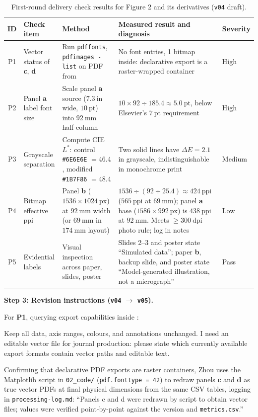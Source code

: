 \begin{table}[htbp]\centering\footnotesize
\setlength{\tabcolsep}{3pt}
\renewcommand{\arraystretch}{1.18}
\caption{First-round delivery check results for Figure 2 and its derivatives (\texttt{v04} draft).}\label{tab:ch13-case-round1}
\begin{tabularx}{\linewidth}{@{}c>{\raggedright\arraybackslash}p{22mm}>{\raggedright\arraybackslash}p{26mm}Y>{\raggedright\arraybackslash}p{16mm}@{}}
\toprule
\textbf{ID} & \textbf{Check item} & \textbf{Method} & \textbf{Measured result and diagnosis} & \textbf{Severity} \\
\midrule
P1 & Vector status of \textbf{c}, \textbf{d} & Run \texttt{pdffonts}, \texttt{pdfimages -list} on PDF from  & No font entries, 1 bitmap inside: declarative export is a raster-wrapped container & High \\
P2 & Panel \textbf{a} label font size & Scale panel \textbf{a} source ($7.3\ \text{in}$ wide, $10\ \text{pt}$) into $92\ \text{mm}$ half-column & $10 \times 92 \div 185.4 \approx 5.0\ \text{pt}$, below Elsevier's $7\ \text{pt}$ requirement & High \\
P3 & Grayscale separation & Compute CIE $L^*$: control \texttt{\#6E6E6E} $= 46.4$, modified \texttt{\#1B7F86} $= 48.4$ & Two solid lines have $\Delta E = 2.1$ in grayscale, indistinguishable in monochrome print & Medium \\
P4 & Bitmap effective ppi & Panel \textbf{b} ($1536 \times 1024\ \text{px}$) at $92\ \text{mm}$ width (or $69\ \text{mm}$ in $174\ \text{mm}$ layout) & $1536 \div (92 \div 25.4) \approx 424\ \text{ppi}$ ($565\ \text{ppi}$ at $69\ \text{mm}$); panel \textbf{a} base ($1586 \times 992\ \text{px}$) is $438\ \text{ppi}$ at $92\ \text{mm}$. Meets $\ge 300\ \text{dpi}$ photo rule; log in notes & Low \\
P5 & Evidential labels & Visual inspection across paper, slides, poster & Slides 2--3 and poster state ``Simulated data''; paper \textbf{b}, backup slide, and poster state ``Model-generated illustration, not a micrograph'' & Pass \\
\bottomrule
\end{tabularx}
\end{table}

\textbf{Step 3: Revision instructions (\texttt{v04} $\rightarrow$ \texttt{v05}).}

For \textbf{P1}, querying export capabilities inside :
\begin{Prompt}
Keep all data, axis ranges, colours, and annotations unchanged. I need an editable vector file for journal production:
please state which currently available export formats contain vector paths and editable text.
\end{Prompt}
Confirming that declarative PDF exports are raster containers, Zhou uses the Matplotlib script in \texttt{02\_code/} (\texttt{pdf.fonttype = 42}) to redraw panels \textbf{c} and \textbf{d} as true vector PDFs at final physical dimensions from the same CSV tables, logging in \texttt{processing-log.md}: ``Panels c and d were redrawn by script to obtain vector files; values were verified point-by-point against the  version and \texttt{metrics.csv}.''

